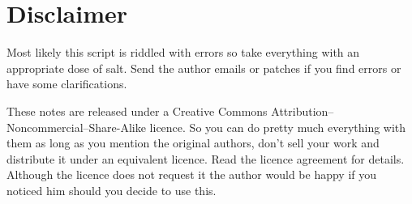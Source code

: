 \section*{Disclaimer}

Most likely this script is riddled with errors so take everything with an appropriate dose of salt. Send the author emails or patches if you find errors or have some clarifications. 

These notes are released under a Creative Commons Attribution--Noncommercial--Share-Alike licence. So you can do pretty much everything with them as long as you mention the original authors, don't sell your work and distribute it under an equivalent licence. Read the licence agreement for details. Although the licence does not request it the author would be happy if you noticed him should you decide to use this.
\newpage